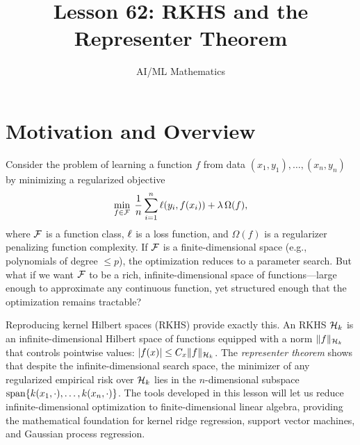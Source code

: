 \documentclass[11pt,a4paper]{article}
\title{Lesson 62: RKHS and the Representer Theorem}
\author{AI/ML Mathematics}
\date{}
\begin{document}
\maketitle
\tableofcontents
\newpage


\section{Motivation and Overview}
\label{sec:motivation}

Consider the problem of learning a function $f$ from data
$(x_1, y_1), \ldots, (x_n, y_n)$ by minimizing a regularized
objective
\[
\min_{f \in \mathcal{F}} \; \frac{1}{n} \sum_{i=1}^n
\ell(y_i, f(x_i)) + \lambda \, \Omega(f),
\]
where $\mathcal{F}$ is a function class, $\ell$ is a loss function,
and $\Omega(f)$ is a regularizer penalizing function complexity. If
$\mathcal{F}$ is a finite-dimensional space (e.g., polynomials of
degree $\le p$), the optimization reduces to a parameter search.
But what if we want $\mathcal{F}$ to be a rich, infinite-dimensional
space of functions---large enough to approximate any continuous
function, yet structured enough that the optimization remains
tractable?

Reproducing kernel Hilbert spaces (RKHS) provide exactly this.
An RKHS $\mathcal{H}_k$ is an infinite-dimensional Hilbert space of
functions equipped with a norm $\|f\|_{\mathcal{H}_k}$ that controls
pointwise values: $|f(x)| \le C_x \|f\|_{\mathcal{H}_k}$. The
\emph{representer theorem} shows that despite the
infinite-dimensional search space, the minimizer of any regularized
empirical risk over $\mathcal{H}_k$ lies in the $n$-dimensional subspace
$\operatorname{span}\{k(x_1, \cdot), \ldots, k(x_n, \cdot)\}$.
The tools developed in this lesson will let us reduce
infinite-dimensional optimization to finite-dimensional linear
algebra, providing the mathematical foundation for kernel ridge
regression, support vector machines, and Gaussian process
regression.
\end{document}

